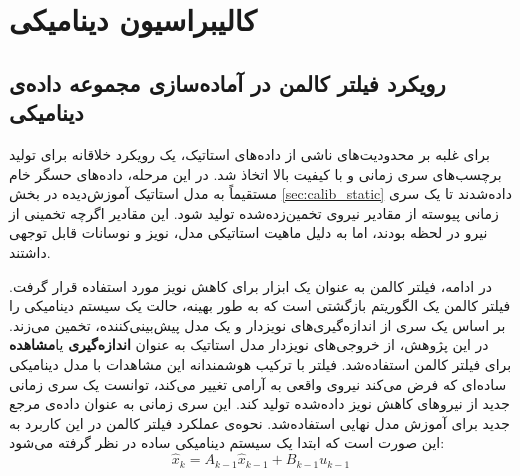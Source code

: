 \section{کالیبراسیون دینامیکی}
\subsection{رویکرد فیلتر کالمن در آماده‌سازی مجموعه داده‌ی دینامیکی}

برای غلبه بر محدودیت‌های ناشی از داده‌های استاتیک، یک رویکرد خلاقانه برای تولید برچسب‌های سری زمانی و با کیفیت بالا اتخاذ شد. در این مرحله، داده‌های حسگر خام مستقیماً به مدل استاتیک آموزش‌دیده در بخش \ref{sec:calib_static} داده‌شدند تا یک سری زمانی پیوسته از مقادیر نیروی تخمین‌زده‌شده تولید شود. این مقادیر اگرچه تخمینی از نیرو در لحظه بودند، اما به دلیل ماهیت استاتیکی مدل، نویز و نوسانات قابل توجهی داشتند.

در ادامه، فیلتر کالمن به عنوان یک ابزار برای کاهش نویز مورد استفاده قرار گرفت. فیلتر کالمن یک الگوریتم بازگشتی است که به طور بهینه، حالت یک سیستم دینامیکی را بر اساس یک سری از اندازه‌گیری‌های نویزدار و یک مدل پیش‌بینی‌کننده، تخمین می‌زند. در این پژوهش، از خروجی‌های نویزدار مدل استاتیک به عنوان \textbf{اندازه‌گیری} یا\textbf{مشاهده} برای فیلتر کالمن استفاده‌شد. فیلتر با ترکیب هوشمندانه این مشاهدات با مدل دینامیکی ساده‌ای که فرض می‌کند نیروی واقعی به آرامی تغییر می‌کند، توانست یک سری زمانی جدید از نیروهای کاهش نویز داده‌شده تولید کند. این سری زمانی به عنوان داده‌ی مرجع جدید برای آموزش مدل نهایی استفاده‌شد. نحوه‌ی عملکرد فیلتر کالمن در این کاربرد به این صورت است که ابتدا یک سیستم دینامیکی ساده در نظر گرفته می‌شود:
\begin{equation}\label{eq:ss}
	\hat{x}_k = A_{k-1} \hat{x}_{k-1} + B_{k-1}u_{k-1}
\end{equation}

